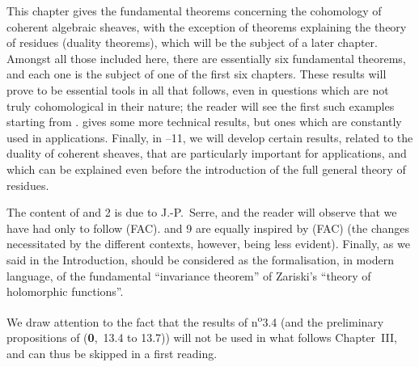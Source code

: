 This chapter gives the fundamental theorems concerning the cohomology of coherent algebraic sheaves, with the exception of theorems explaining the theory of residues (duality theorems), which will be the subject of a later chapter.
Amongst all those included here, there are essentially six fundamental theorems, and each one is the subject of one of the first six chapters.
These results will prove to be essential tools in all that follows, even in questions which are not truly cohomological in their nature;
the reader will see the first such examples starting from .
 gives some more technical results, but ones which are constantly used in applications.
Finally, in \textsection{}--11, we will develop certain results, related to the duality of coherent sheaves, that are particularly important for applications, and which can be explained even before the introduction of the full general theory of residues.

The content of \textsection{} and 2 is due to J.-P.~Serre, and the reader will observe that we have had only to follow (FAC).
 and 9 are equally inspired by (FAC) (the changes necessitated by the different contexts, however, being less evident).
Finally, as we said in the Introduction,  should be considered as the formalisation, in modern language, of the fundamental ``invariance theorem'' of Zariski's ``theory of holomorphic functions''.

We draw attention to the fact that the results of n\textsuperscript{o}3.4 (and the preliminary propositions of (\textbf{0},~13.4 to 13.7)) will not be used in what follows Chapter~III, and can thus be skipped in a first reading.
\bigskip














